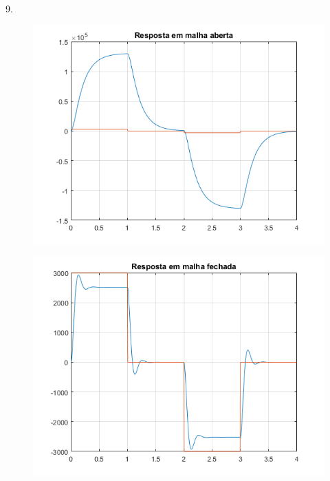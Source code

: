 \documentclass[a4paper,11pt]{article}
\begin{document}
\pagebreak

9.
\begin{figure}[H]
\includegraphics{exp01e09-aberta}
\centering
\end{figure}
\begin{figure}[H]
\includegraphics{exp01e09-fechada}
\centering
\end{figure}

\pagebreak
\end{document}

